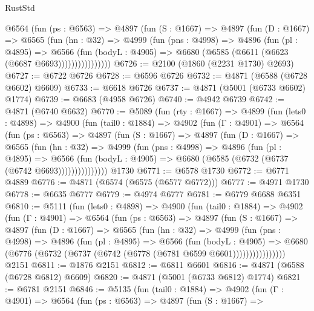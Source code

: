 \begin{lexlean}{RustStd}
\begin{coremodule}
{\begin{coremodule}
{{{{{{{{{{{{{{{{{{{{{{{{{{{{{            @6564
              (fun (ps : @6563) =>
              @4897
                (fun (S : @1667) =>
                @4897
                  (fun (D : @1667) =>
                  @6565
                    (fun (hn : @32) =>
                    @4999
                      (fun (pns : @4998) =>
                      @4896
                        (fun (pl : @4895) =>
                        @6566
                          (fun (bodyL : @4905) =>
                          @6680 (@6585 (@6611 (@6623 (@6687 @6693))))))))))))))))
@6726 := @2100 (@1860 (@2231 @1730) @2693)
@6727 := @6722 @6726
@6728 := @6596 @6726
@6732 := @4871 (@6588 (@6728 @6602) @6609)
@6733 := @6618 @6726
@6737 := @4871 (@5001 (@6733 @6602) @1774)
@6739 := @6683 (@4958 @6726)
@6740 := @4942 @6739
@6742 := @4871 (@6740 @6632)
@6770 := @5089
    (fun (rty : @1667) =>
    @4899
      (fun (lets0 : @4898) =>
      @4900
        (fun (tail0 : @1884) =>
        @4902
          (fun (Γ : @4901) =>
          @6564
            (fun (ps : @6563) =>
            @4897
              (fun (S : @1667) =>
              @4897
                (fun (D : @1667) =>
                @6565
                  (fun (hn : @32) =>
                  @4999
                    (fun (pns : @4998) =>
                    @4896
                      (fun (pl : @4895) =>
                      @6566
                        (fun (bodyL : @4905) =>
                        @6680 (@6585 (@6732 (@6737 (@6742 @6693)))))))))))))))
    @1730
@6771 := @6578 @1730
@6772 := @6771 @4889
@6776 := @4871 (@6574 (@6575 (@6577 @6772)))
@6777 := @4971 @1730
@6778 := @6635 @6777
@6779 := @4974 @6777
@6781 := @6779 @6688 @6351
@6810 := @5111
    (fun (lets0 : @4898) =>
    @4900
      (fun (tail0 : @1884) =>
      @4902
        (fun (Γ : @4901) =>
        @6564
          (fun (ps : @6563) =>
          @4897
            (fun (S : @1667) =>
            @4897
              (fun (D : @1667) =>
              @6565
                (fun (hn : @32) =>
                @4999
                  (fun (pns : @4998) =>
                  @4896
                    (fun (pl : @4895) =>
                    @6566
                      (fun (bodyL : @4905) =>
                      @6680 (@6776 (@6732 (@6737 (@6742 (@6778 (@6781 @6599 @6601))))))))))))))))
    @2151
@6811 := @1876 @2151
@6812 := @6811 @6601
@6816 := @4871 (@6588 (@6728 @6812) @6609)
@6820 := @4871 (@5001 (@6733 @6812) @1774)
@6821 := @6781 @2151
@6846 := @5135
    (fun (tail0 : @1884) =>
    @4902
      (fun (Γ : @4901) =>
      @6564
        (fun (ps : @6563) =>
        @4897
          (fun (S : @1667) =>
}}}}}}}}}}}}}}}}}}}}}}}}}}}}}
\end{coremodule}}
\end{coremodule}
\end{lexlean}
